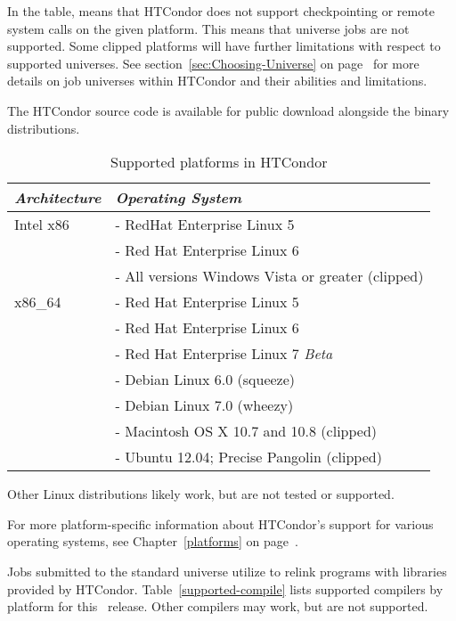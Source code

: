 In the table,  means that HTCondor does not support
checkpointing or remote system calls on the given platform. 
This means that  universe jobs are not supported.
Some clipped platforms will have further limitations with respect
to supported universes.
See section~\ref{sec:Choosing-Universe} on
page~\pageref{sec:Choosing-Universe} for more details on job universes
within HTCondor and their abilities and limitations.

The HTCondor source code is available for 
public download alongside the binary distributions.

\begin{center}
\begin{table}[hbt]
\begin{tabular}{|p{6cm}p{7cm}|} \hline
\emph{Architecture} & \emph{Operating System} \\ \hline \hline
Intel x86 & - RedHat Enterprise Linux 5 \\
 & - Red Hat Enterprise Linux 6 \\
 & - All versions Windows Vista or greater (clipped) \\
x86\_64 & - Red Hat Enterprise Linux 5 \\ 
 & - Red Hat Enterprise Linux 6 \\
 & - Red Hat Enterprise Linux 7 \emph{Beta} \\
 & - Debian Linux 6.0 (squeeze) \\
 & - Debian Linux 7.0 (wheezy) \\ \hline 
 & - Macintosh OS X 10.7 and 10.8 (clipped) \\ \hline
 & - Ubuntu 12.04; Precise Pangolin (clipped) \\ \hline
\end{tabular}
\caption{\label{table:supported-platforms}Supported platforms in HTCondor \VersionNotice}
\end{table}
\end{center}


\Note Other Linux distributions likely work, but are not tested
or supported.

For more platform-specific information about HTCondor's support for
various operating systems, see Chapter~\ref{platforms} on
page~\pageref{platforms}. 



Jobs submitted to the standard universe utilize 
to relink programs with libraries provided by HTCondor.
Table~\ref{supported-compile} lists supported compilers by
platform for this \VersionNotice\ release.
Other compilers may work, but are not supported.


